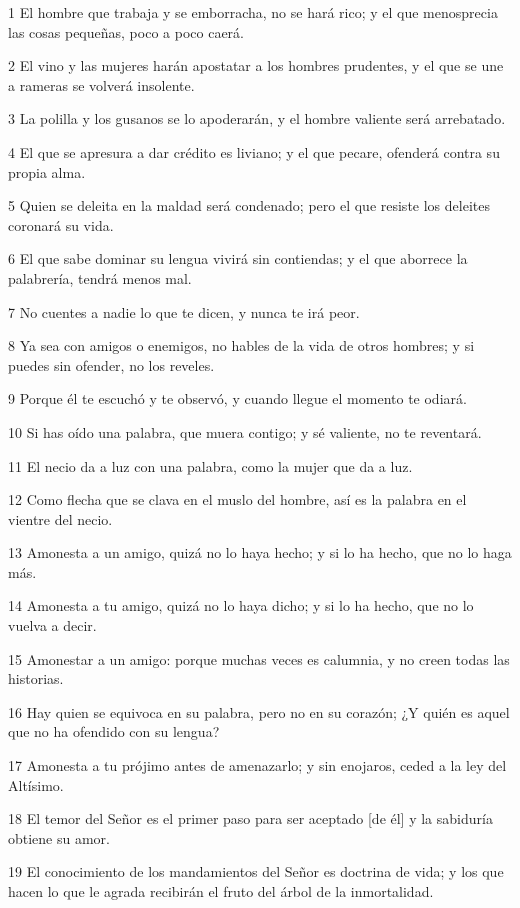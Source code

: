 \par 1 El hombre que trabaja y se emborracha, no se hará rico; y el que menosprecia las cosas pequeñas, poco a poco caerá.
\par 2 El vino y las mujeres harán apostatar a los hombres prudentes, y el que se une a rameras se volverá insolente.
\par 3 La polilla y los gusanos se lo apoderarán, y el hombre valiente será arrebatado.
\par 4 El que se apresura a dar crédito es liviano; y el que pecare, ofenderá contra su propia alma.
\par 5 Quien se deleita en la maldad será condenado; pero el que resiste los deleites coronará su vida.
\par 6 El que sabe dominar su lengua vivirá sin contiendas; y el que aborrece la palabrería, tendrá menos mal.
\par 7 No cuentes a nadie lo que te dicen, y nunca te irá peor.
\par 8 Ya sea con amigos o enemigos, no hables de la vida de otros hombres; y si puedes sin ofender, no los reveles.
\par 9 Porque él te escuchó y te observó, y cuando llegue el momento te odiará.
\par 10 Si has oído una palabra, que muera contigo; y sé valiente, no te reventará.
\par 11 El necio da a luz con una palabra, como la mujer que da a luz.
\par 12 Como flecha que se clava en el muslo del hombre, así es la palabra en el vientre del necio.
\par 13 Amonesta a un amigo, quizá no lo haya hecho; y si lo ha hecho, que no lo haga más.
\par 14 Amonesta a tu amigo, quizá no lo haya dicho; y si lo ha hecho, que no lo vuelva a decir.
\par 15 Amonestar a un amigo: porque muchas veces es calumnia, y no creen todas las historias.
\par 16 Hay quien se equivoca en su palabra, pero no en su corazón; ¿Y quién es aquel que no ha ofendido con su lengua?
\par 17 Amonesta a tu prójimo antes de amenazarlo; y sin enojaros, ceded a la ley del Altísimo.
\par 18 El temor del Señor es el primer paso para ser aceptado [de él] y la sabiduría obtiene su amor.
\par 19 El conocimiento de los mandamientos del Señor es doctrina de vida; y los que hacen lo que le agrada recibirán el fruto del árbol de la inmortalidad.
